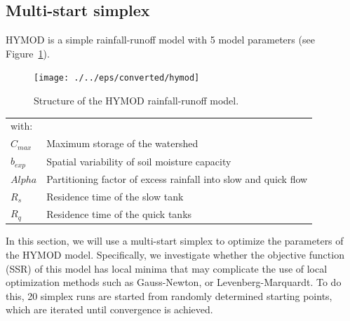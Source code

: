 






\subsection{Multi-start simplex}

HYMOD \citep{boyl-gupt-soro2000} is a simple rainfall-runoff model with 5 model parameters (see Figure~\ref{fig:hymod}).

\begin{figure}[htbp]
  \centering
    \texttt{[image: ./../eps/converted/hymod]}
  \caption{Structure of the HYMOD rainfall-runoff model.}
  \label{fig:hymod}
\end{figure}
\begin{tabular}{ll}
with:&&\\
$C_{max}$&Maximum storage of the watershed\\
$b_{exp}$&Spatial variability of soil moisture capacity\\
$Alpha$&Partitioning factor of excess rainfall into slow and quick flow\\
$R_{s}$&Residence time of the slow tank\\
$R_{q}$&Residence time of the quick tanks\\
\end{tabular}

In this section, we will use a multi-start simplex \citep{neld-mead1965} to optimize the parameters of the HYMOD model. Specifically, we investigate whether the objective function (SSR) of this model has local minima that may complicate the use of local optimization methods such as Gauss-Newton, or Levenberg-Marquardt. To do this, 20 simplex runs are started from randomly determined starting points, which are iterated until convergence is achieved.

